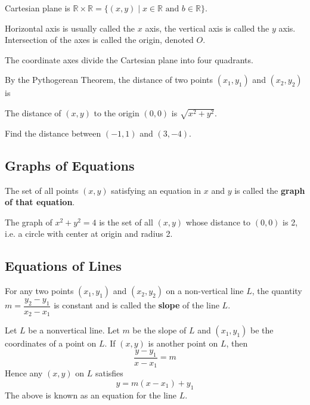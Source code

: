 \documentclass[../main.tex]{subfiles}
\begin{document}
Cartesian plane is $\mathbb{R}\times \mathbb{R} = \{(x,y) \mid x \in \mathbb{R} \text{ and } b \in \mathbb{R} \}$.

\begin{figure}[H]
  \centering
  
\end{figure}

Horizontal axis is usually called the $x$ axis, the vertical axis is called the $y$ axis. Intersection of the axes is called the origin, denoted $O$.

The coordinate axes divide the Cartesian plane into four quadrants.
\begin{figure}[H]
  \centering
  
\end{figure}

By the Pythogerean Theorem, the distance of two points $(x_1, y_1)$ and $(x_2, y_2)$ is
\begin{figure}[H]
  \centering
  
\end{figure}

The distance of $(x,y)$ to the origin $(0,0)$ is $\sqrt{x^2+y^2}$.
\begin{example}
  Find the distance between $(-1, 1)$ and $(3, -4)$.
\end{example}

\subsection*{Graphs of Equations}
The set of all points $(x,y)$ satisfying an equation in $x$ and $y$ is called the \textbf{graph of that equation}.

\begin{example}
  The graph of $x^2+y^2=4$ is the set of all $(x,y)$ whose distance to $(0,0)$ is 2, i.e. a circle with center at origin and radius 2.
\end{example}

\subsection*{Equations of Lines}
For any two points $(x_1, y_1)$ and $(x_2, y_2)$ on a non-vertical line $L$, the quantity $m=\dfrac{y_2-y_1}{x_2-x_1}$ is constant and is called the \textbf{slope} of the line $L$.

Let $L$ be a nonvertical line. Let $m$ be the slope of $L$ and $(x_1, y_1)$ be the coordinates of a point on $L$. If $(x,y)$ is another point on $L$, then
\[
  \frac{y-y_1}{x-x_1} = m
\]
Hence any $(x,y)$ on $L$ satisfies
\[
  y = m(x-x_1) + y_1
\]
The above is known as an equation for the line $L$.
\end{document}
